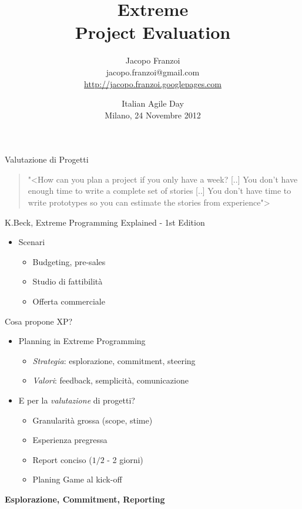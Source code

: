 \documentclass[compress, red, 14pt, pdf]{beamer}
\title{ Extreme \\ Project Evaluation }
\author{
	Jacopo Franzoi \\
	{\scriptsize jacopo.franzoi@gmail.com } \\
	{\scriptsize \href{http://jacopo.franzoi.googlepages.com/}{http://jacopo.franzoi.googlepages.com} \\ }
}
\date{
	Italian Agile Day \\
	Milano, 24 Novembre 2012
}
\newcommand{\highlight}[1]{{\color{purple} \emph{#1}}}
\begin{document}
	\begin{frame}
		\titlepage
	\end{frame}	

	\begin{frame}{Valutazione di Progetti}
		\begin{quote}
			{\small "<{How can you plan a project if you only have a week? [..] You don't have enough time to write a complete set of stories [..] You don't have time to write prototypes so you can estimate the stories from experience}">}
		\end{quote}
		\hfill {\scriptsize K.Beck, Extreme Programming Explained - 1st Edition}

		\begin{itemize}
			\item Scenari
			\begin{itemize}
				\item Budgeting, pre-sales
				\item Studio di fattibilità
				\item Offerta commerciale
			\end{itemize}
		\end{itemize}
	\end{frame}


	\begin{frame}{Cosa propone XP?}
		\begin{itemize}
			\item Planning in Extreme Programming
			\begin{itemize}
				\item \highlight{Strategia}: esplorazione, commitment, steering
				\item \highlight{Valori}: feedback, semplicità, comunicazione
			\end{itemize}
		\end{itemize}

		\begin{itemize}
			\item E per la \highlight{valutazione} di progetti?
			\begin{itemize}
				\item Granularità grossa (scope, stime)
				\item Esperienza pregressa
				\item Report conciso ($1/2$ - 2 giorni)
				\item Planing Game al kick-off
			\end{itemize}
		\end{itemize}
		
		\begin{center}
			\textbf{Esplorazione, Commitment, Reporting}
		\end{center}
	\end{frame}
\end{document}
